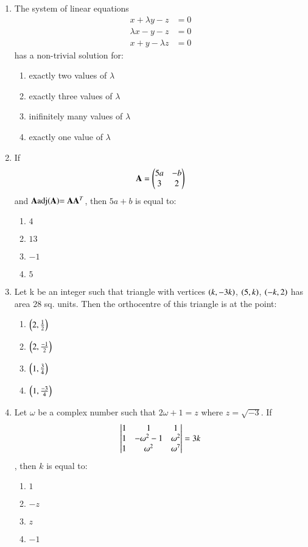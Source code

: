 \documentclass[journal,onecolumn]{IEEEtran}
\theoremstyle{remark}
\begin{document}
\begin{enumerate}
	\item The system of linear equations 
	\begin{align*}
		x+\lambda y-z &= 0\\
		\lambda x-y-z &= 0\\
		x+y-\lambda z &= 0
	\end{align*}
	has a non-trivial solution for:

	\hfill{}
	\begin{enumerate}
		\item exactly two values of $\lambda$ 
		\item exactly three values of $\lambda$ 
		\item inifinitely many values of $\lambda$
		\item exactly one value of $\lambda$ 
	\end{enumerate}


\item If \begin{align*} \mathbf{A} = \begin{pmatrix}5a&-b\\3&2\end{pmatrix}\end{align*} and $\vec{A} \adj{\vec{A}} = \vec{A}\vec{A}^{T}$, then $5a + b$ is equal to: 
	\hfill{}
	\begin{enumerate}
	    	\item $4$ 
	    	\item $13$
	    	\item $-1$
	   	\item $5$ 
	\end{enumerate}

	\item Let k be an integer such that triangle with vertices $\left(k, -3k\right)$, $\left(5,k\right)$, $\left(-k,2\right)$ has area $28$ sq. units. Then the orthocentre of this triangle is at the point:
	\hfill{}
	\begin{enumerate}
	    	\item $\left(2,\frac{1}{2}\right)$ 
	    	\item $\left(2,\frac{-1}{2}\right)$ 
	     	\item $\left(1,\frac{3}{4}\right)$ 
	    	\item $\left(1,\frac{-3}{4}\right)$ 
	\end{enumerate}


    \item Let $\omega$ be a complex number such that $2\omega + 1 = z$ where $z = \sqrt{-3}$. If
	\begin{align*} \begin{vmatrix}1&1&1\\1&-\omega^2-1&\omega^2\\1&\omega^2&\omega^7\end{vmatrix} = 3k \end{align*}, then $k$ is equal to:
	\hfill{}
	\begin{enumerate}[label={(\alph*)}]
	    	\item $1$ 
	    	\item $-z$
	     	\item $z$
	    	\item $-1$
	\end{enumerate}
\end{enumerate}
\end{document}
